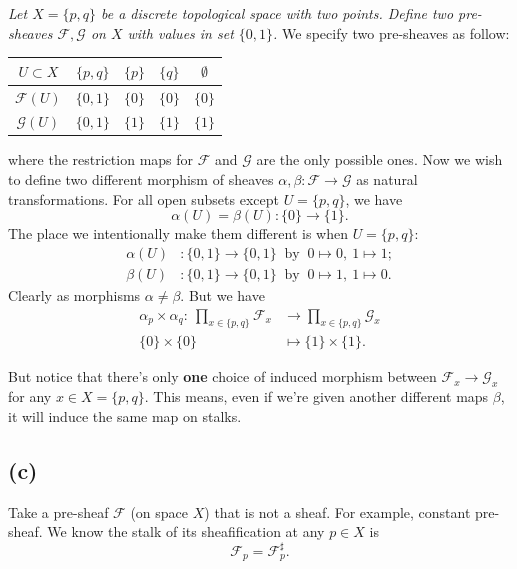 \textit{Let $X=\{p,q\}$ be a discrete topological space with two points. Define two pre-sheaves $\mathscr F,\mathscr G$ on $X$ with values in set $\{0,1\}$.}
We specify two pre-sheaves as follow: 
\begin{center}
	\begin{tabular}{ |c|c|c|c|c| }
		\hline
		$U\subset X$ & $\{p,q\}$ & $\{p\}$ & $\{q\}$ & $\emptyset$\\
		\hline
		$\mathscr F(U)$ & $\{0,1\}$ & $\{0\}$ & $\{0\}$ & $\{0\}$ \\
		\hline
		$\mathscr G(U)$ & $\{0,1\}$ & $\{1\}$ & $\{1\}$ & $\{1\}$\\
		\hline
	\end{tabular}
\end{center} where the restriction maps for $\mathscr F$ and $\mathscr G$ are the only possible ones. Now we wish to define two different morphism of sheaves $\alpha,\beta:\mathscr F\to\mathscr G$ as natural transformations. For all open subsets except $U=\{p,q\}$, we have 
\[\alpha(U)=\beta(U):\{0\}\to\{1\}.\]
The place we intentionally make them different is when $U=\{p,q\}$:
\begin{align*}
	\alpha(U)&:\{0,1\}\to \{0,1\} ~\text{ by }~ 0\mapsto 0,~ 1\mapsto 1;\\
	\beta(U)&:\{0,1\}\to \{0,1\} ~\text{ by }~ 0\mapsto 1,~ 1\mapsto 0.
\end{align*}
Clearly as morphisms $\alpha\neq\beta$. But we have 
\begin{align*}
	\alpha_p\times\alpha_q:~ \prod_{x\in \{p,q\}}\mathscr F_x &\to \prod_{x\in\{p,q\}} \mathscr G_x\\ 
	\{0\}\times\{0\} &\mapsto\{1\}\times\{1\}.
\end{align*}

But notice that there's only \textbf{one} choice of induced morphism between $\mathscr F_x\to\mathscr G_x$ for any $x\in X=\{p,q\}$. This means, even if we're given another different maps $\beta$, it will induce the same map on stalks.



\subsection{(c)}

Take a pre-sheaf $\mathscr F$ (on space $X$) that is not a sheaf. For example, constant pre-sheaf. We know the stalk of its sheafification at any $p\in X$ is 
\[\mathscr F_p=\mathscr F^{\sharp}_p.\]

